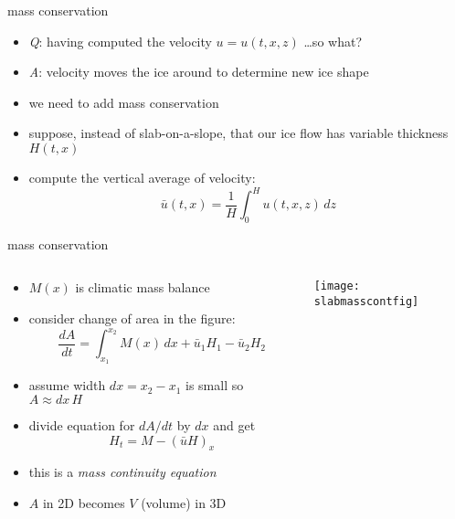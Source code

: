 \begin{frame}{mass conservation}

\begin{itemize}
\item \emph{Q}: having computed the velocity $u=u(t,x,z)$ \dots so what?
\item \emph{A}: velocity moves the ice around to determine new ice shape

\bigskip
\item we need to add \alert{mass conservation}
\item suppose, instead of slab-on-a-slope, that our ice flow has variable thickness $H(t,x)$
\item compute the vertical average of velocity:
	$$\bar u(t,x) = \frac{1}{H}\int_0^{H} u(t,x,z)\,dz$$
\end{itemize}
\end{frame}


\begin{frame}{mass conservation }

\begin{columns}
\begin{column}{0.6\textwidth}
\small
\begin{itemize}
\item $M(x)$ is climatic mass balance
\item consider change of area in the figure:
	$$\frac{dA}{dt} = \int_{x_1}^{x_2} M(x)\,dx + \bar u_1 H_1 - \bar u_2 H_2$$
\item assume width $dx=x_2-x_1$ is small so $A\approx dx\, H$
\item divide equation for $dA/dt$ by $dx$ and get
   $$H_t = M - \left(\bar u H\right)_x$$
\item this is a \emph{mass continuity equation}
\item $A$ in 2D becomes $V$ (volume) in 3D
\end{itemize}
\end{column}
\begin{column}{0.4\textwidth}
\texttt{[image: slabmasscontfig]}
\end{column}
\end{columns}

\end{frame}


